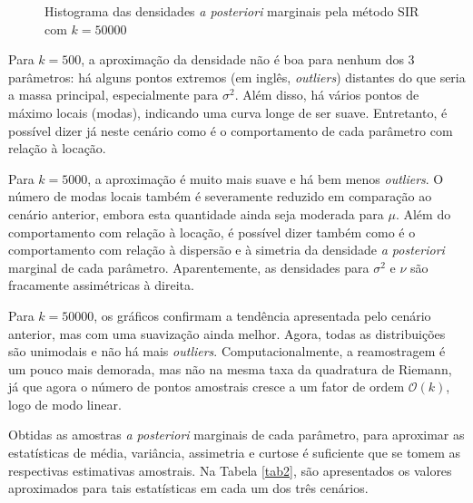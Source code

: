 \begin{figure}[t]
	\caption{Histograma das densidades \textit{a posteriori} marginais pela método SIR com $k = 50000$}%
\end{figure}

Para $k=500$, a aproximação da densidade não é boa para nenhum dos 3 parâmetros: há alguns pontos extremos (em inglês, \textit{outliers}) distantes do que seria a massa principal, especialmente para $\sigma^2$. Além disso, há vários pontos de máximo locais (modas), indicando uma curva longe de ser suave. Entretanto, é possível dizer já neste cenário como é o comportamento de cada parâmetro com relação à locação.

Para $k=5000$, a aproximação é muito mais suave e há bem menos \textit{outliers}. O número de modas locais também é severamente reduzido em comparação ao cenário anterior, embora esta quantidade ainda seja moderada para $\mu$. Além do comportamento com relação à locação, é possível dizer também como é o comportamento com relação à dispersão e à simetria da densidade \textit{a posteriori} marginal de cada parâmetro. Aparentemente, as densidades para $\sigma^2$ e $\nu$ são fracamente assimétricas à direita.

Para $k=50000$, os gráficos confirmam a tendência apresentada pelo cenário anterior, mas com uma suavização ainda melhor. Agora, todas as distribuições são unimodais e não há mais \textit{outliers}. Computacionalmente, a reamostragem é um pouco mais demorada, mas não na mesma taxa da quadratura de Riemann, já que agora o número de pontos amostrais cresce a um fator de ordem $\mathcal{O}(k)$, logo de modo linear.

Obtidas as amostras \textit{a posteriori} marginais de cada parâmetro, para aproximar as estatísticas de média, variância, assimetria e curtose é suficiente que se tomem as respectivas estimativas amostrais. Na Tabela \ref{tab2}, são apresentados os valores aproximados para tais estatísticas em cada um dos três cenários.

